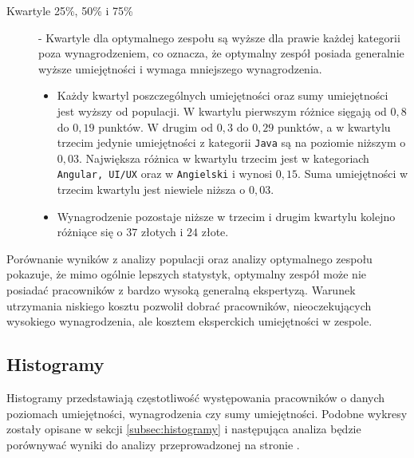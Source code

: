 \begin{description}
        \item[Kwartyle 25\%, 50\% i 75\%\label{itm:kwartyl_2}] - Kwartyle dla optymalnego zespołu są wyższe dla prawie każdej kategorii poza wynagrodzeniem, co oznacza, że optymalny zespół posiada generalnie wyższe umiejętności i wymaga mniejszego wynagrodzenia.
            \begin{itemize}
                \item Każdy kwartyl poszczególnych umiejętności oraz sumy umiejętności jest wyższy od populacji. W kwartylu pierwszym różnice sięgają od $0,8$ do $0,19$ punktów. W drugim od $0,3$ do $0,29$ punktów, a w kwartylu trzecim jedynie umiejętności z kategorii \verb|Java| są na poziomie niższym o $0,03$. Największa różnica w kwartylu trzecim jest w kategoriach \verb|Angular, UI/UX| oraz w \verb|Angielski| i wynosi $0,15$. Suma umiejętności w trzecim kwartylu jest niewiele niższa o $0,03$.
                \item Wynagrodzenie pozostaje niższe w trzecim i drugim kwartylu kolejno różniące się o $37$ złotych i $24$ złote.
            \end{itemize}
        
    \end{description}
    
    \par Porównanie wyników z analizy populacji oraz analizy optymalnego zespołu pokazuje, że mimo ogólnie lepszych statystyk, optymalny zespół może nie posiadać pracowników z bardzo wysoką generalną ekspertyzą. Warunek utrzymania niskiego kosztu pozwolił dobrać pracowników, nieoczekujących wysokiego wynagrodzenia, ale kosztem eksperckich umiejętności w zespole.
    
    \subsection{Histogramy}
    \par Histogramy przedstawiają częstotliwość występowania pracowników o danych poziomach umiejętności, wynagrodzenia czy sumy umiejętności. Podobne wykresy zostały opisane w sekcji \ref{subsec:histogramy} i następująca analiza będzie porównywać wyniki do analizy przeprowadzonej na stronie \pageref{subsec:histogramy}.
    
